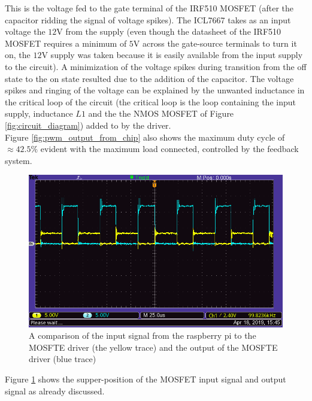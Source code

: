 \documentclass[a4paper, 12pt]{article}
\begin{document}
This is the voltage fed to the gate terminal of the IRF510 MOSFET (after the capacitor ridding the signal of voltage spikes). The ICL7667 takes as an input voltage the $12$V from the supply (even though the datasheet of the IRF510 MOSFET requires a minimum of $5$V across the gate-source terminals to turn it on, the $12$V supply was taken because it is easily available from the input supply to the circuit). A minimization of the voltage spikes during transition from the off state to the on state resulted due to the addition of the capacitor. The voltage spikes and ringing of the voltage can be explained by the unwanted inductance in the critical loop of the circuit (the critical loop is the loop containing the input supply, inductance $L1$ and the the NMOS MOSFET of Figure \ref{fig:circuit_diagram}) added to by the driver. \\

Figure \ref{fig:pwm_output_from_chip} also shows the maximum duty cycle of $\approx 42.5\%$ evident with the maximum load connected, controlled by the feedback system. \\

\begin{figure}[H]
  \centering
  \includegraphics[width=\textwidth]{images/pwm_input_output_comparison.png}
  \caption{A comparison of the input signal from the raspberry pi to the MOSFTE driver (the yellow trace) and the output of the MOSFTE driver (blue trace)}
  \label{fig:pwm_input_output_comparison}
\end{figure}

Figure \ref{fig:pwm_input_output_comparison} shows the supper-position of the MOSFET input signal and output signal as already discussed.\\
\end{document}
